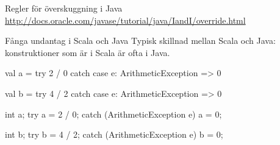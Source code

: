 \begin{Slide}{Regler för överskuggning i Java}
\url{http://docs.oracle.com/javase/tutorial/java/IandI/override.html}
\end{Slide}
  


\begin{Slide}{Fånga undantag i Scala och Java}
Typisk skillnad mellan Scala och Java:\\konstruktioner som är  i Scala är ofta  i Java.
\begin{multicols}{2}
  \noindent{}
\begin{CodeSmall}[basicstyle=\ttfamily\SlideFontSize{6}{8},backgroundcolor=\color{white},
  frame=none]
val a = try 2 / 0 catch
  case e: ArithmeticException => 0


val b = try 4 / 2 catch 
  case e: ArithmeticException => 0
\end{CodeSmall}

\columnbreak

\noindent{}
\begin{CodeSmall}[language=Java,basicstyle=\ttfamily\SlideFontSize{6}{8},backgroundcolor=\color{white},
  frame=none]
int a;
try {
    a = 2 / 0;
} catch (ArithmeticException e) {
    a = 0;
}

int b;
try {
    b = 4 / 2;
} catch (ArithmeticException e) {
    b = 0;
}

\end{CodeSmall}
\end{multicols}
\end{Slide}




